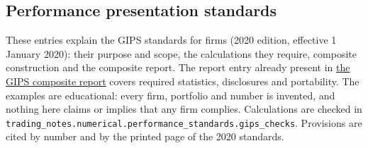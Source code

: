 \subsection{Performance presentation standards}

These entries explain the GIPS standards for firms (2020 edition, effective 1 January 2020): their purpose and scope, the calculations they require, composite construction and the composite report. The report entry already present in \hyperref[meth:gips-composite-presentation]{the GIPS composite report} covers required statistics, disclosures and portability. The examples are educational: every firm, portfolio and number is invented, and nothing here claims or implies that any firm complies. Calculations are checked in \nolinkurl{trading_notes.numerical.performance_standards.gips_checks}. Provisions are cited by number and by the printed page of the 2020 standards.

